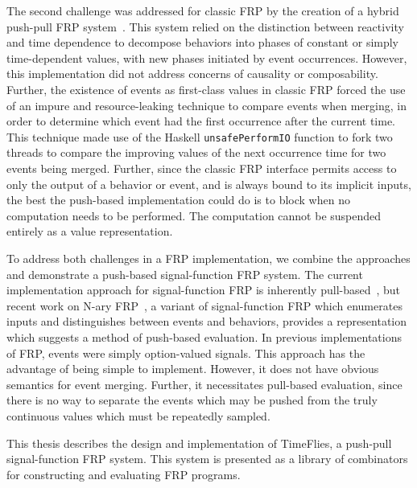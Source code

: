 The second challenge was addressed for classic FRP by the creation of a hybrid
push-pull FRP system~\cite{Elliott2009}. This system relied on the distinction
between reactivity and time dependence to decompose behaviors into phases of
constant or simply time-dependent values, with new phases initiated by event
occurrences. However, this implementation did not address concerns of causality
or composability. Further, the existence of events as first-class values in
classic FRP forced the use of an impure and resource-leaking technique to
compare events when merging, in order to determine which event had the first
occurrence after the current time. This technique made use of the Haskell
{\tt unsafePerformIO} function to fork two threads to compare the improving
values of the next occurrence time for two events being merged. Further, since
the classic FRP interface permits access to only the output of a behavior or
event, and is always bound to its implicit inputs, the best the push-based
implementation could do is to block when no computation needs to be performed.
The computation cannot be suspended entirely as a value representation.

To address both challenges in a FRP implementation, we combine the approaches
and demonstrate a push-based signal-function FRP system. The current
implementation approach for signal-function FRP is inherently
pull-based~\cite{Nilsson2002}, but recent work on N-ary
FRP~\cite{Sculthorpe2011}, a variant of signal-function FRP which enumerates
inputs and distinguishes between events and behaviors, provides a representation
which suggests a method of push-based evaluation. In previous implementations of
FRP, events were simply option-valued signals. This approach has the advantage
of being simple to implement. However, it does not have obvious semantics for
event merging. Further, it necessitates pull-based evaluation, since there is no
way to separate the events which may be pushed from the truly continuous values
which must be repeatedly sampled.

This thesis describes the design and implementation of TimeFlies, a push-pull signal-function FRP system. This system is presented as a library
of combinators for constructing and evaluating FRP programs.

